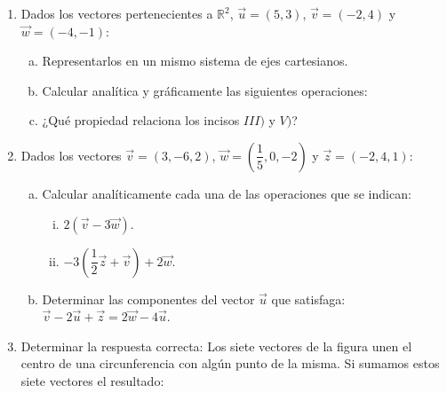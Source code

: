 \begin{enumerate}[\hspace{-3mm}$1)$]
\item Dados los vectores pertenecientes a $\mathbb{R}^2$, $\vec u=(5,3)$, $\vec v=(-2,4)$ y $\vec w=(-4,-1)$:
\begin{enumerate}[a)]
\item Representarlos en un mismo sistema de ejes cartesianos.
\item Calcular analítica y gráficamente las siguientes operaciones:
\begin{enumerate}[i)]
\end{enumerate}
\item ¿Qué propiedad relaciona los incisos {\scriptsize$III)$} y {\scriptsize$V)$}?
\end{enumerate}

\item Dados los vectores $\vec v=(3,-6,2)$, $\vec w=\left(\dfrac15,0,-2\right)$ y $\vec z=(-2,4,1)$:
\begin{enumerate}[a)]
\item Calcular analíticamente cada una de las operaciones que se indican:
\begin{enumerate}[i)]
\item $2(\vec v-3\vec w)$.
\item $-3\left(\dfrac12\vec z+\vec v\right)+2\vec w$.
\end{enumerate}
\item Determinar las componentes del vector $\vec u$ que satisfaga: $\vec v-2\vec u+\vec z=2\vec w-4\vec u$.
\end{enumerate}

\item Determinar la respuesta correcta: Los siete vectores de la figura unen el centro de una circunferencia con algún punto de la misma. Si sumamos estos siete vectores el resultado:


\end{enumerate}
